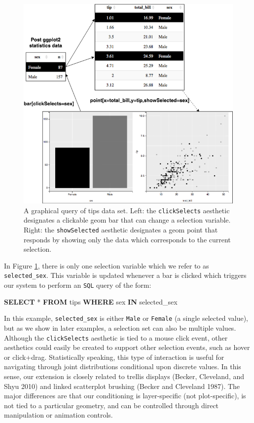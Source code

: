 \documentclass[12pt,]{article}
\newenvironment{Shaded}{\begin{snugshade}}{\end{snugshade}}
\newcommand{\KeywordTok}[1]{\textcolor[rgb]{0.13,0.29,0.53}{\textbf{#1}}}
\newcommand{\NormalTok}[1]{#1}
\theoremstyle{definition}
\theoremstyle{definition}
\theoremstyle{definition}
\theoremstyle{remark}
\begin{document}
\begin{figure}
\centering
\includegraphics{images/tips}
\caption{\label{fig:tips}A graphical query of tips data set. Left: the
\texttt{clickSelects} aesthetic designates a clickable geom bar that can
change a selection variable. Right: the \texttt{showSelected} aesthetic
designates a geom point that responds by showing only the data which
corresponds to the current selection.}
\end{figure}

In Figure \ref{fig:tips}, there is only one selection variable which we
refer to as \texttt{selected\_sex}. This variable is updated whenever a
bar is clicked which triggers our system to perform an \texttt{SQL}
query of the form:

\begin{Shaded}
\begin{Highlighting}[]
\KeywordTok{SELECT}\NormalTok{ * }\KeywordTok{FROM}\NormalTok{ tips}
  \KeywordTok{WHERE}\NormalTok{ sex }\KeywordTok{IN}\NormalTok{ selected_sex}
\end{Highlighting}
\end{Shaded}

In this example, \texttt{selected\_sex} is either \texttt{Male} or
\texttt{Female} (a single selected value), but as we show in later
examples, a selection set can also be multiple values. Although the
\texttt{clickSelects} aesthetic is tied to a mouse click event, other
aesthetics could easily be created to support other selection events,
such as hover or click+drag. Statistically speaking, this type of
interaction is useful for navigating through joint distributions
conditional upon discrete values. In this sense, our extension is
closely related to trellis displays (Becker, Cleveland, and Shyu 2010)
and linked scatterplot brushing (Becker and Cleveland 1987). The major
differences are that our conditioning is layer-specific (not
plot-specific), is not tied to a particular geometry, and can be
controlled through direct manipulation or animation controls.
\end{document}
